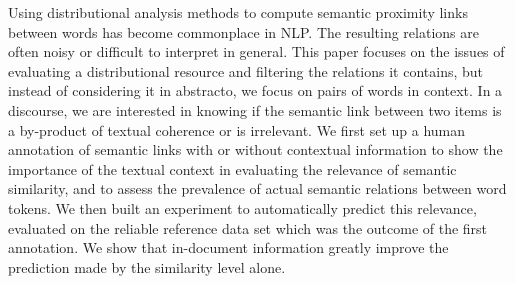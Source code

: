 Using distributional analysis methods to compute semantic proximity links between words has become commonplace in NLP. The resulting relations  are often noisy or difficult to interpret in general. This paper focuses on the issues of evaluating a distributional resource and filtering the relations it contains, but instead of considering it in abstracto, we focus on pairs of words in context. In a discourse, we are interested in knowing if the semantic link between two items is a by-product of textual coherence or is irrelevant. We first set up a human annotation of semantic links with or without contextual information to show the importance of the textual context in evaluating the relevance of semantic similarity, and to assess the prevalence of actual semantic relations between word tokens. We then built an experiment to automatically predict this relevance, evaluated on the reliable reference data set which was the outcome of the first annotation. We show that in-document information greatly improve the prediction made by the similarity level alone.
